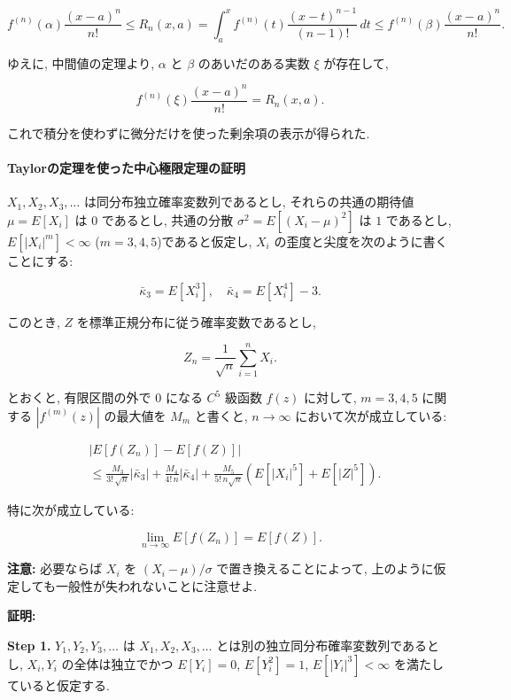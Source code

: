 \documentclass[10pt, a4paper,xelatex,ja=standard]{bxjsarticle}
\newcommand\bk{\bar\kappa}
\begin{document}
\[
f^{(n)}(\alpha)\frac{(x-a)^n}{n!} \le
R_n(x,a) = \int_a^x f^{(n)}(t)\frac{(x-t)^{n-1}}{(n-1)!}\,dt
\le f^{(n)}(\beta)\frac{(x-a)^n}{n!}.
\]

ゆえに, 中間値の定理より, \(\alpha\) と \(\beta\) のあいだのある実数
\(\xi\) が存在して,

\[
f^{(n)}(\xi)\frac{(x-a)^n}{n!} = R_n(x, a).
\]

これで積分を使わずに微分だけを使った剰余項の表示が得られた.

    \hypertarget{taylorux306eux5b9aux7406ux3092ux4f7fux3063ux305fux4e2dux5fc3ux6975ux9650ux5b9aux7406ux306eux8a3cux660e}{%
\paragraph{Taylorの定理を使った中心極限定理の証明}\label{taylorux306eux5b9aux7406ux3092ux4f7fux3063ux305fux4e2dux5fc3ux6975ux9650ux5b9aux7406ux306eux8a3cux660e}}

\(X_1,X_2,X_3,\ldots\) は同分布独立確率変数列であるとし,
それらの共通の期待値 \(\mu=E[X_i]\) は \(0\) であるとし, 共通の分散
\(\sigma^2=E[(X_i-\mu)^2]\) は \(1\) であるとし, \(E[|X_i|^m]<\infty\)
(\(m=3,4,5\))であると仮定し, \(X_i\)
の歪度と尖度を次のように書くことにする:

\[
\bk_3 = E[X_i^3], \quad \bk_4 = E[X_i^4] - 3.
\]

このとき, \(Z\) を標準正規分布に従う確率変数であるとし,

\[
Z_n = \frac{1}{\sqrt{n}} \sum_{i=1}^n X_i.
\]

とおくと, 有限区間の外で \(0\) になる \(C^5\) 級函数 \(f(z)\) に対して,
\(m=3,4,5\) に関する \(|f^{(m)}(z)|\) の最大値を \(M_m\) と書くと,
\(n\to\infty\) において次が成立している:

\[
\begin{aligned}
&
|E[f(Z_n)] - E[f(Z)]|
\\ &\le
\frac{M_3}{3!\,\sqrt{n}}|\bk_3| +
\frac{M_4}{4!\,n}|\bk_4| +
\frac{M_5}{5!\,n\sqrt{n}}(E[|X_i|^5] + E[|Z|^5]).
\end{aligned}
\]

特に次が成立している:

\[
\lim_{n\to\infty} E[f(Z_n)] = E[f(Z)].
\]

\textbf{注意:} 必要ならば \(X_i\) を \((X_i-\mu)/\sigma\)
で置き換えることによって,
上のように仮定しても一般性が失われないことに注意せよ.

    \textbf{証明:}

\textbf{Step 1.} \(Y_1,Y_2,Y_3,\ldots\) は \(X_1,X_2,X_3,\ldots\)
とは別の独立同分布確率変数列であるとし, \(X_i,Y_i\) の全体は独立でかつ
\(E[Y_i]=0\), \(E[Y_i^2]=1\), \(E[|Y_i|^3]<\infty\)
を満たしていると仮定する.
\end{document}
